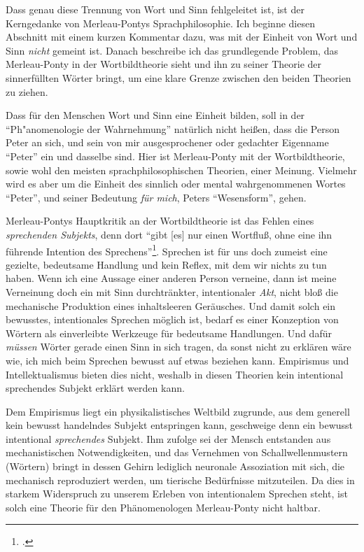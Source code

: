 \documentclass[a4paper, 12pt]{article}
\begin{document}
\begin{onehalfspace}
\noindent Dass genau diese Trennung von Wort und Sinn fehlgeleitet ist, ist der Kerngedanke von Merleau-Pontys Sprachphilosophie. Ich beginne diesen Abschnitt mit einem kurzen Kommentar dazu, was mit der Einheit von Wort und Sinn \emph{nicht} gemeint ist. Danach beschreibe ich das grundlegende Problem, das Merleau-Ponty in der Wortbildtheorie sieht und ihn zu seiner Theorie der sinnerfüllten Wörter bringt, um eine klare Grenze zwischen den beiden Theorien zu ziehen.

Dass für den Menschen Wort und Sinn eine Einheit bilden, soll in der "`Ph"anomenologie der Wahrnehmung"' natürlich nicht heißen, dass die Person Peter an sich, und sein von mir ausgesprochener oder gedachter Eigenname "`Peter"' ein und dasselbe sind. Hier ist Merleau-Ponty mit der Wortbildtheorie, sowie wohl den meisten sprachphilosophischen Theorien, einer Meinung. Vielmehr wird es aber um die Einheit des sinnlich oder mental wahrgenommenen Wortes "`Peter"', und seiner Bedeutung \emph{für mich}, Peters "`Wesensform"', gehen. 

Merleau-Pontys Hauptkritik an der Wortbildtheorie ist das Fehlen eines \emph{sprechenden Subjekts}, denn dort "`gibt [es] nur einen Wortfluß, ohne eine ihn führende Intention des Sprechens"'\footnote{\Cite[Siehe][S. 208]{merleau1966phanomenologie}.}. Sprechen ist für uns doch zumeist eine gezielte, bedeutsame Handlung und kein Reflex, mit dem wir nichts zu tun haben. Wenn ich eine Aussage einer anderen Person verneine, dann ist meine Verneinung doch ein mit Sinn durchtränkter, intentionaler \emph{Akt}, nicht bloß die mechanische Produktion eines inhaltsleeren Geräusches. Und damit solch ein bewusstes, intentionales Sprechen möglich ist, bedarf es einer Konzeption von Wörtern als einverleibte Werkzeuge für bedeutsame Handlungen. Und dafür \emph{müssen} Wörter gerade einen Sinn in sich tragen, da sonst nicht zu erklären wäre wie, ich mich beim Sprechen bewusst auf etwas beziehen kann. Empirismus und Intellektualismus bieten dies nicht, weshalb in diesen Theorien kein intentional sprechendes Subjekt erklärt werden kann.

Dem Empirismus liegt ein physikalistisches Weltbild zugrunde, aus dem generell kein bewusst handelndes Subjekt entspringen kann, geschweige denn ein bewusst intentional \emph{sprechendes} Subjekt. Ihm zufolge sei der Mensch entstanden aus mechanistischen Notwendigkeiten, und das Vernehmen von Schallwellenmustern (Wörtern) bringt in dessen Gehirn lediglich neuronale Assoziation mit sich, die mechanisch reproduziert werden, um tierische Bedürfnisse mitzuteilen. Da dies in starkem Widerspruch zu unserem Erleben von intentionalem Sprechen steht, ist solch eine Theorie für den Phänomenologen Merleau-Ponty nicht haltbar.


\end{onehalfspace}
\end{document}
